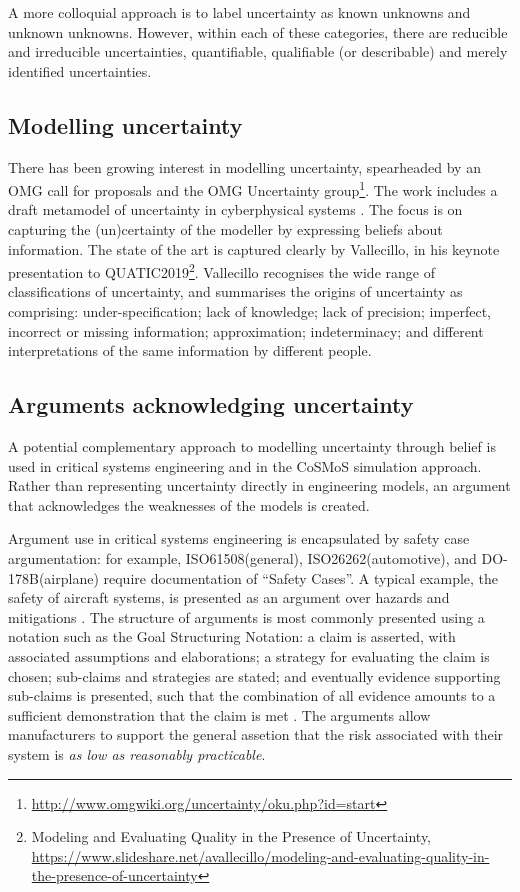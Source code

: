 \documentclass[sigconf,authordraft]{acmart}
\begin{document}
A more colloquial approach is to label uncertainty as known unknowns and unknown unknowns.  However, within each of these categories, there are reducible and irreducible uncertainties, quantifiable, qualifiable (or describable) and merely identified uncertainties.


\subsection{Modelling uncertainty} 
 
There has been growing interest in modelling uncertainty, spearheaded by an OMG call for proposals and the OMG Uncertainty group\footnote{\url{http://www.omgwiki.org/uncertainty/oku.php?id=start}}.   The work includes a draft metamodel of uncertainty in cyberphysical systems \cite{unc-RFP}.  The focus is on capturing the (un)certainty of the modeller by expressing beliefs about information.  The state of the art is captured clearly by Vallecillo, in his keynote presentation to QUATIC2019\footnote{Modeling and Evaluating Quality in the Presence of Uncertainty, \url{https://www.slideshare.net/avallecillo/modeling-and-evaluating-quality-in-the-presence-of-uncertainty}}.  Vallecillo recognises the wide range of classifications of uncertainty, and  summarises the origins of uncertainty as comprising: under-specification; lack of knowledge; lack of precision; imperfect, incorrect or missing information; approximation; indeterminacy; and different interpretations of the same information by different people. 

\subsection{Arguments acknowledging uncertainty}
A potential complementary approach to modelling uncertainty through belief is used in critical systems engineering and in the CoSMoS simulation approach.  Rather than representing uncertainty directly in engineering models, an argument that acknowledges the weaknesses of the models is created.  

Argument use in critical systems engineering is encapsulated by safety case argumentation: for example, ISO61508(general), ISO26262(automotive), and DO-178B(airplane) require documentation of “Safety Cases”.  A typical example, the safety of aircraft systems, is presented as an argument over hazards and mitigations \cite{kelly2004systematic}.  The structure of arguments is most commonly presented using a notation such as the Goal Structuring Notation: a claim is asserted, with associated assumptions and elaborations; a strategy for evaluating the claim is chosen; sub-claims and strategies are stated; and eventually evidence supporting sub-claims is presented, such that the combination of all evidence amounts to a sufficient demonstration that the claim is met \cite{GSNStandard}.  The arguments allow manufacturers to support the general assetion that the risk associated with their system is \emph{as low as reasonably practicable}.
\end{document}
